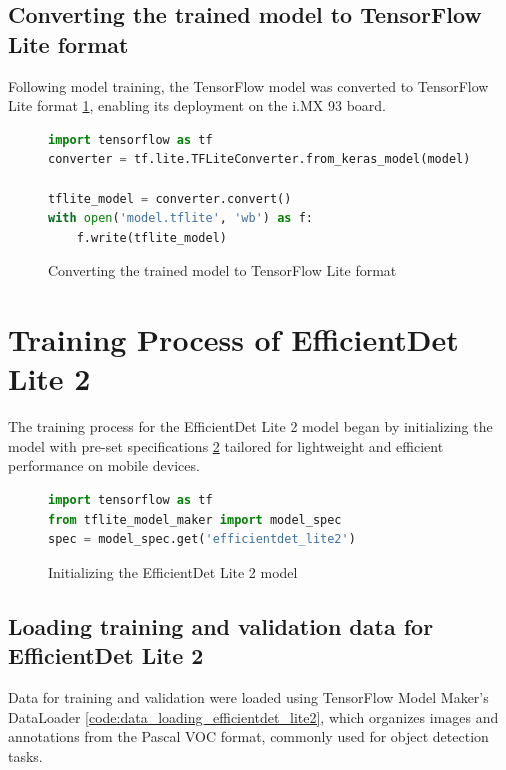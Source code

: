 \subsection{Converting the trained model to TensorFlow Lite format}
Following model training, the TensorFlow model was converted to TensorFlow Lite format \ref{code:model_conversion}, enabling its deployment on the i.MX 93 board.

\begin{figure}[H]
\begin{lstlisting}[language=Python]
import tensorflow as tf
converter = tf.lite.TFLiteConverter.from_keras_model(model)

tflite_model = converter.convert()
with open('model.tflite', 'wb') as f:
    f.write(tflite_model)
\end{lstlisting}
\caption{Converting the trained model to TensorFlow Lite format}
\label{code:model_conversion}
\end{figure}

\newpage
\section{Training Process of EfficientDet Lite 2}

The training process for the EfficientDet Lite 2 model began by initializing the model with pre-set specifications \ref{code:init_efficientdet_lite2} tailored for lightweight and efficient performance on mobile devices.

\begin{figure}[H]
\begin{lstlisting}[language=Python]
import tensorflow as tf
from tflite_model_maker import model_spec
spec = model_spec.get('efficientdet_lite2')
\end{lstlisting}
\caption{Initializing the EfficientDet Lite 2 model}
\label{code:init_efficientdet_lite2}
\end{figure}

\subsection{Loading training and validation data for EfficientDet Lite 2}
Data for training and validation were loaded using TensorFlow Model Maker's DataLoader \ref{code:data_loading_efficientdet_lite2}, which organizes images and annotations from the Pascal VOC format, commonly used for object detection tasks.

